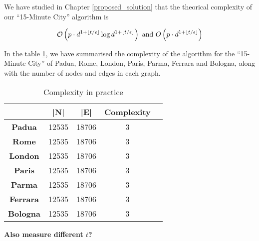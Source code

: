 We have studied in Chapter \ref{proposed_solution} that the theorical complexity of our ``15-Minute City'' algorithm is

$$\mathcal{O}\left(p\cdot d^{1+\floor*{t/\epsilon}}\log d^{1+\floor*{t/\epsilon}}\right)\text{ and }O\left(p\cdot d^{1+\floor*{t/\epsilon}}\right)$$

In the table \ref{tab:complexity}, we have summarised the complexity of the algorithm for the ``15-Minute City'' of Padua, Rome, London, Paris, Parma, Ferrara and Bologna, along with the number of nodes and edges in each graph.

\begin{table}[htbp]
    \begin{center}
        \caption{Complexity in practice}
        \label{tab:complexity}
        \begin{tabular}{c|cccc}
            \hline
             & \textbf{|N|} & \textbf{|E|} & \textbf{Complexity} \\
            \hline
            \textbf{Padua} & 12535 & 18706 & 3 \\
            \textbf{Rome} & 12535 & 18706 & 3 \\
            \textbf{London} & 12535 & 18706 & 3 \\
            \textbf{Paris} & 12535 & 18706 & 3 \\
            \textbf{Parma} & 12535 & 18706 & 3 \\
            \textbf{Ferrara} & 12535 & 18706 & 3 \\
            \textbf{Bologna} & 12535 & 18706 & 3 \\
            \hline
        \end{tabular}
    \end{center}
\end{table}

\textbf{Also measure different $t$?}